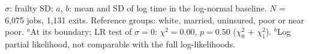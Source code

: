 $\sigma$: frailty SD; $a$, $b$: mean and SD of log time in the log-normal baseline. $N$ = 6,075 jobs, 1,131 exits. Reference groups: white, married, uninsured, poor or near poor. $^{a}$At its boundary; LR test of $\sigma = 0$: $\chi^2 = 0.00$, $p = 0.50$ (\textonehalf$\chi^2_0$ + \textonehalf$\chi^2_1$). $^{b}$Log partial likelihood, not comparable with the full log-likelihoods.

